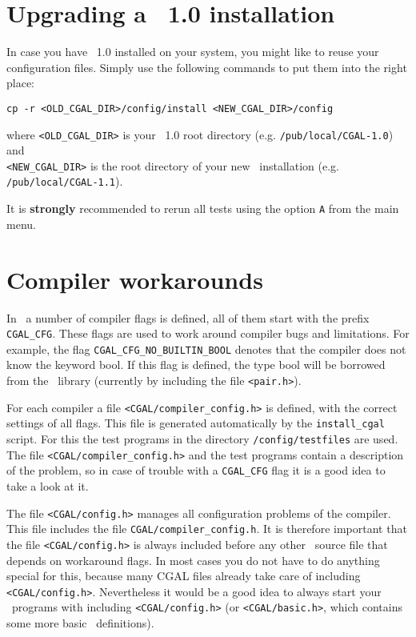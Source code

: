\section{Upgrading a \cgal\ 1.0 installation}
In case you have \cgal\ 1.0 installed on your system, you might like
to reuse your configuration files. Simply use the following commands
to put them into the right place:
\begin{verbatim}
cp -r <OLD_CGAL_DIR>/config/install <NEW_CGAL_DIR>/config
\end{verbatim}
where \texttt{<OLD\_CGAL\_DIR>} is your \cgal\ 1.0 root directory
(e.g.  \texttt{/pub/local/CGAL-1.0}) and\\
\texttt{<NEW\_CGAL\_DIR>} is the root directory of your new \cgal\ 
installation (e.g. {\tt /pub/local/CGAL-1.1}).

It is \textbf{strongly} recommended to rerun all tests using the
option \texttt{A} from the main menu.

\section{Compiler workarounds}
In \cgal\ a number of compiler flags is defined, all of them start
with the prefix \texttt{CGAL\_CFG}. These flags are used to work
around compiler bugs and limitations.  For example, the flag
\texttt{CGAL\_CFG\_NO\_BUILTIN\_BOOL} denotes that the compiler does
not know the keyword bool. If this flag is defined, the type bool will
be borrowed from the \stl\ library (currently by including the file
\texttt{<pair.h>}).

For each compiler a file \texttt{<CGAL/compiler\_config.h>} is
defined, with the correct settings of all flags. This file is
generated automatically by the \texttt{install\_cgal} script. For this
the test programs in the directory \texttt{\cgaldir/config/testfiles}
are used. The file \texttt{<CGAL/compiler\_config.h>} and the test
programs contain a description of the problem, so in case of trouble
with a \texttt{CGAL\_CFG} flag it is a good idea to take a look at it.

The file \texttt{<CGAL/config.h>} manages all configuration problems
of the compiler.  This file includes the file
\texttt{CGAL/compiler\_config.h}.  It is therefore important that the
file \texttt{<CGAL/config.h>} is always included before any other
\cgal\ source file that depends on workaround flags. In most cases you
do not have to do anything special for this, because many CGAL files
already take care of including \texttt{<CGAL/config.h>}. Nevertheless
it would be a good idea to always start your \cgal\ programs with
including \texttt{<CGAL/config.h>} (or \texttt{<CGAL/basic.h>}, which
contains some more basic \cgal\ definitions).

